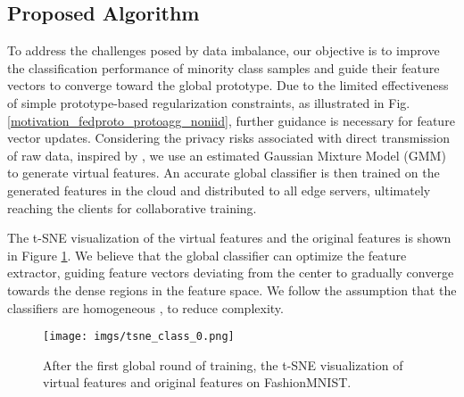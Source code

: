\documentclass[journal]{IEEEtran}
\begin{document}
\subsection{Proposed Algorithm}
To address the challenges posed by data imbalance, our objective is to improve the classification performance of minority class samples and guide their feature vectors to converge toward the global prototype. Due to the limited effectiveness of simple prototype-based regularization constraints, as illustrated in Fig.\ref{motivation_fedproto_protoagg_noniid}, further guidance is necessary for feature vector updates. Considering the privacy risks associated with direct transmission of raw data, inspired by \cite{luo_no_2021}, we use an estimated Gaussian Mixture Model (GMM) to generate virtual features. An accurate global classifier is then trained on the generated features in the cloud and distributed to all edge servers, ultimately reaching the clients for collaborative training.

The t-SNE visualization of the virtual features and the original features is shown in Figure \ref{tsne_class_0}. We believe that the global classifier can optimize the feature extractor, guiding feature vectors deviating from the center to gradually converge towards the dense regions in the feature space. We follow the assumption that the classifiers are homogeneous \cite{tan_fedproto_2021,zhang_fedtgp_2024}, to reduce complexity.

\begin{figure}[ht]
  \centering
  \texttt{[image: imgs/tsne\_class\_0.png]}
  \caption{After the first global round of training, the t-SNE visualization of virtual features and original features on FashionMNIST.}
  \label{tsne_class_0}
\end{figure}
\end{document}

